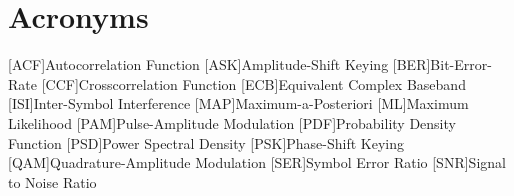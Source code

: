 \chapter{Acronyms}
\begin{acronym}[QAM]
    [ACF]{Autocorrelation Function}
    [ASK]{Amplitude-Shift Keying}
    [BER]{Bit-Error-Rate}
    [CCF]{Crosscorrelation Function}
    [ECB]{Equivalent Complex Baseband}
    [ISI]{Inter-Symbol Interference}
    [MAP]{Maximum-a-Posteriori}
    [ML]{Maximum Likelihood}
    [PAM]{Pulse-Amplitude Modulation}
    [PDF]{Probability Density Function}
    [PSD]{Power Spectral Density}
    [PSK]{Phase-Shift Keying}
    [QAM]{Quadrature-Amplitude Modulation}
    [SER]{Symbol Error Ratio}
    [SNR]{Signal to Noise Ratio}
\end{acronym}
